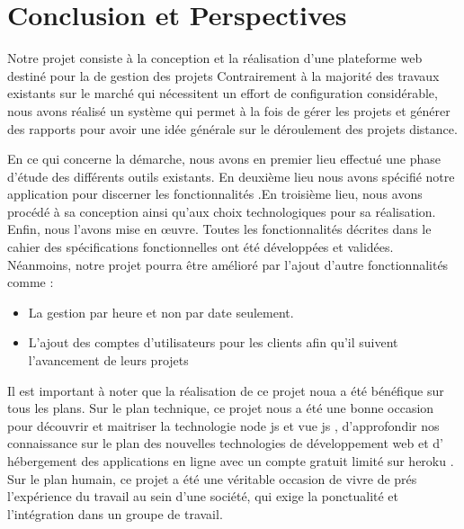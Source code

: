 
\chapter*{Conclusion et Perspectives}

Notre projet  consiste \`{a} la conception et la r\'{e}alisation d'une plateforme web destin\'{e} pour la de gestion des projets
Contrairement \`{a} la majorit\'{e} des travaux existants sur le march\'{e} qui n\'{e}cessitent un effort de configuration consid\'{e}rable, nous avons r\'{e}alis\'{e} un syst\`{e}me qui permet \`{a} la fois de g\'{e}rer les projets et g\'{e}n\'{e}rer des rapports pour avoir une id\'{e}e g\'{e}n\'{e}rale sur le d\'{e}roulement des projets distance.

En ce qui concerne la d\'{e}marche, nous avons en premier lieu effectu\'{e} une phase d'\'{e}tude des diff\'{e}rents outils existants. En deuxi\`{e}me lieu nous avons sp\'{e}cifi\'{e} notre application pour discerner les fonctionnalit\'{e}s .En troisi\`{e}me lieu, nous avons proc\'{e}d\'{e} \`{a} sa conception ainsi qu'aux choix technologiques pour sa r\'{e}alisation. Enfin, nous l'avons mise en \oe{}uvre.
Toutes les fonctionnalit\'{e}s d\'{e}crites dans le cahier des sp\'{e}cifications fonctionnelles ont \'{e}t\'{e} d\'{e}velopp\'{e}es et valid\'{e}es. N\'{e}anmoins, notre projet pourra \^{e}tre am\'{e}lior\'{e} par l'ajout d'autre
fonctionnalit\'{e}s comme :

\begin{itemize}
\item{ La gestion par heure et non par date seulement.}
\item{ L'ajout des comptes d'utilisateurs pour les clients afin qu'il suivent l'avancement de leurs projets}
\end{itemize}


Il est important \`{a} noter que la r\'{e}alisation de ce projet noua a \'{e}t\'{e} b\'{e}n\'{e}fique sur tous les plans.
Sur le plan technique, ce projet nous a \'{e}t\'{e} une bonne occasion pour d\'{e}couvrir et maitriser la technologie node js et vue js , d'approfondir nos connaissance sur le plan des nouvelles technologies de d\'{e}veloppement web et d' h\'{e}bergement des applications en ligne avec un compte gratuit limit\'{e} sur \guillemotleft{} heroku \guillemotright{}.
Sur le plan humain, ce projet a \'{e}t\'{e} une v\'{e}ritable occasion de vivre de pr\'{e}s l'exp\'{e}rience du travail au sein d'une soci\'{e}t\'{e}, qui exige la ponctualit\'{e} et l'int\'{e}gration dans un groupe de travail.

